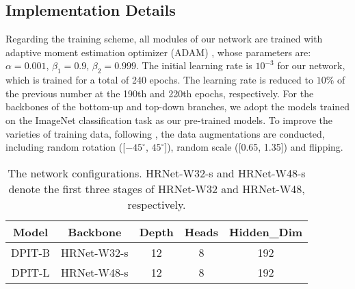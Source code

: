 \documentclass[runningheads]{llncs}
\begin{document}
\subsection{Implementation Details}
\label{sec:Implementation}
Regarding the training scheme, all modules of our network are trained with adaptive moment estimation optimizer (ADAM) \cite{2014Adam}, whose parameters are: $\alpha=0.001$, $\beta_{1}=0.9$, $\beta_{2}=0.999$. The initial learning rate is $10^{-3}$ for our network, which is trained for a total of 240 epochs. The learning rate is reduced to $10\%$ of the previous number at the 190th and 220th epochs, respectively. For the backbones of the bottom-up and top-down branches, we adopt the models trained on the ImageNet classification task as our pre-trained models. To improve the varieties of training data, following \cite{HRNet2019}, the data augmentations are conducted, including random rotation ([$-45^{\circ}$, $45^{\circ}$]), random scale ([0.65, 1.35]) and flipping.

\begin{center}
\begin{table}
  \caption{The network configurations. HRNet-W32-s and HRNet-W48-s denote the first three stages of HRNet-W32 and HRNet-W48, respectively.}
  \label{Setting_Table}
  \begin{center}
  \begin{tabular}{c|c|ccc}
  \toprule
  Model     & Backbone  & Depth  & Heads  & Hidden\_Dim \\
  \midrule
  \midrule
  DPIT-B    & HRNet-W32-s  & 12  & 8  & 192     \\
  DPIT-L    & HRNet-W48-s  & 12  & 8  & 192   \\
  \bottomrule
  \end{tabular}
  \end{center}
\end{table}
\end{center}
\end{document}
